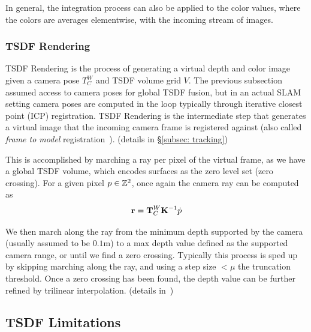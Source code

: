 In general, the integration process can also be applied to the color values, where the colors are averages elementwise, with the incoming stream of images.

\subsubsection{TSDF Rendering}

TSDF Rendering is the process of generating a virtual depth and color image given a camera pose $T_C^W$ and TSDF volume grid $V$. The previous subsection assumed access to camera poses for global TSDF fusion, but in an actual SLAM setting camera poses are computed in the loop typically through iterative closest point (ICP) registration. TSDF Rendering is the intermediate step that generates a virtual image that the incoming camera frame is registered against (also called \emph{frame to model} registration~\cite{newcombeKinectFusionRealtimeDense2011}). (details in \S\ref{subsec: tracking})

This is accomplished by marching a ray per pixel of the virtual frame, as we have a global TSDF volume, which encodes surfaces as the zero level set (zero crossing). For a given pixel $p \in \mathbb{Z}^2$, once again the camera ray can be computed as
\begin{align*}
    \mathbf{r} = \mathbf{T}_C^W \mathbf{K}^{-1} \dot{p}
\end{align*}

We then march along the ray from the minimum depth supported by the camera (usually assumed to be $0.1$m) to a max depth value defined as the supported camera range, or until we find a zero crossing. Typically this process is sped up by skipping marching along the ray, and using a step size $< \mu$ the truncation threshold. Once a zero crossing has been found, the depth value can be further refined by trilinear interpolation. (details in~\cite{newcombeKinectFusionRealtimeDense2011})

\subsection{TSDF Limitations}

